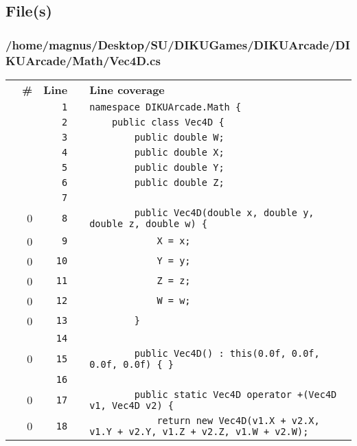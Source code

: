 \documentclass[a4paper,landscape,10pt]{article}
\begin{document}
\subsection{File(s)}
\subsubsection{/home/magnus/Desktop/SU/DIKUGames/DIKUArcade/DIKUArcade/Math/Vec4D.cs}
\begin{longtable}[l]{lrrll}
\textbf{} & \textbf{\#} & \textbf{Line} & \textbf{} & \textbf{Line coverage}\\
\cellcolor{gray} &  & \verb~1~ & & \verb~namespace DIKUArcade.Math {~\\
\cellcolor{gray} &  & \verb~2~ & & \verb~    public class Vec4D {~\\
\cellcolor{gray} &  & \verb~3~ & & \verb~        public double W;~\\
\cellcolor{gray} &  & \verb~4~ & & \verb~        public double X;~\\
\cellcolor{gray} &  & \verb~5~ & & \verb~        public double Y;~\\
\cellcolor{gray} &  & \verb~6~ & & \verb~        public double Z;~\\
\cellcolor{gray} &  & \verb~7~ & & \verb~~\\
\cellcolor{red} & 0 & \verb~8~ & & \verb~        public Vec4D(double x, double y, double z, double w) {~\\
\cellcolor{red} & 0 & \verb~9~ & & \verb~            X = x;~\\
\cellcolor{red} & 0 & \verb~10~ & & \verb~            Y = y;~\\
\cellcolor{red} & 0 & \verb~11~ & & \verb~            Z = z;~\\
\cellcolor{red} & 0 & \verb~12~ & & \verb~            W = w;~\\
\cellcolor{red} & 0 & \verb~13~ & & \verb~        }~\\
\cellcolor{gray} &  & \verb~14~ & & \verb~~\\
\cellcolor{red} & 0 & \verb~15~ & & \verb~        public Vec4D() : this(0.0f, 0.0f, 0.0f, 0.0f) { }~\\
\cellcolor{gray} &  & \verb~16~ & & \verb~~\\
\cellcolor{red} & 0 & \verb~17~ & & \verb~        public static Vec4D operator +(Vec4D v1, Vec4D v2) {~\\
\cellcolor{red} & 0 & \verb~18~ & & \verb~            return new Vec4D(v1.X + v2.X, v1.Y + v2.Y, v1.Z + v2.Z, v1.W + v2.W);~\\

\end{longtable}
\end{document}
